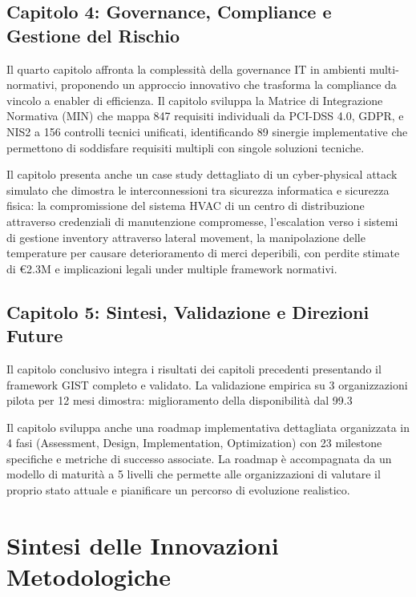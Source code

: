 \subsection{Capitolo 4: Governance, Compliance e Gestione del Rischio}

Il quarto capitolo affronta la complessità della governance IT in ambienti multi-normativi, proponendo un approccio innovativo che trasforma la compliance da vincolo a enabler di efficienza. Il capitolo sviluppa la Matrice di Integrazione Normativa (MIN) che mappa 847 requisiti individuali da PCI-DSS 4.0, GDPR, e NIS2 a 156 controlli tecnici unificati, identificando 89 sinergie implementative che permettono di soddisfare requisiti multipli con singole soluzioni tecniche.

Il capitolo presenta anche un case study dettagliato di un cyber-physical attack simulato che dimostra le interconnessioni tra sicurezza informatica e sicurezza fisica: la compromissione del sistema HVAC di un centro di distribuzione attraverso credenziali di manutenzione compromesse, l'escalation verso i sistemi di gestione inventory attraverso lateral movement, la manipolazione delle temperature per causare deterioramento di merci deperibili, con perdite stimate di €2.3M e implicazioni legali under multiple framework normativi.

\subsection{Capitolo 5: Sintesi, Validazione e Direzioni Future}

Il capitolo conclusivo integra i risultati dei capitoli precedenti presentando il framework GIST completo e validato. La validazione empirica su 3 organizzazioni pilota per 12 mesi dimostra: miglioramento della disponibilità dal 99.3%

Il capitolo sviluppa anche una roadmap implementativa dettagliata organizzata in 4 fasi (Assessment, Design, Implementation, Optimization) con 23 milestone specifiche e metriche di successo associate. La roadmap è accompagnata da un modello di maturità a 5 livelli che permette alle organizzazioni di valutare il proprio stato attuale e pianificare un percorso di evoluzione realistico.

\section{Sintesi delle Innovazioni Metodologiche}

